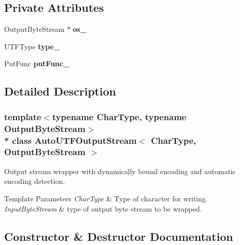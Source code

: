 \subsection*{Private Attributes}
\begin{DoxyCompactItemize}
\item 
Output\+Byte\+Stream $\ast$ {\bfseries os\+\_\+}\hypertarget{class_auto_u_t_f_output_stream_a723efb60d9fdb46e6094db891d24a509}{}\label{class_auto_u_t_f_output_stream_a723efb60d9fdb46e6094db891d24a509}

\item 
U\+T\+F\+Type {\bfseries type\+\_\+}\hypertarget{class_auto_u_t_f_output_stream_a767a11d3801e410881972013376d69eb}{}\label{class_auto_u_t_f_output_stream_a767a11d3801e410881972013376d69eb}

\item 
Put\+Func {\bfseries put\+Func\+\_\+}\hypertarget{class_auto_u_t_f_output_stream_af15ae56768d0f65b5938eab255493274}{}\label{class_auto_u_t_f_output_stream_af15ae56768d0f65b5938eab255493274}

\end{DoxyCompactItemize}


\subsection{Detailed Description}
\subsubsection*{template$<$typename Char\+Type, typename Output\+Byte\+Stream$>$\\*
class Auto\+U\+T\+F\+Output\+Stream$<$ Char\+Type, Output\+Byte\+Stream $>$}

Output stream wrapper with dynamically bound encoding and automatic encoding detection. 


\begin{DoxyTemplParams}{Template Parameters}
{\em Char\+Type} & Type of character for writing. \\
\hline
{\em Input\+Byte\+Stream} & type of output byte stream to be wrapped. \\
\hline
\end{DoxyTemplParams}


\subsection{Constructor \& Destructor Documentation}
